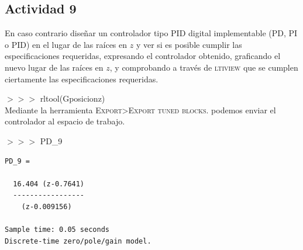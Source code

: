 \newpage
\subsection{Actividad 9}
En caso contrario diseñar un controlador tipo PID digital
implementable (PD, PI o PID) en el lugar de las raíces en $z$ y ver si
es posible cumplir las especificaciones requeridas, expresando el
controlador obtenido, graficando el nuevo lugar de las raíces en $z$,
y comprobando a través de \textsc{ltiview} que se cumplen ciertamente
las especificaciones requeridas.

\begin{tcolorbox}[sharp corners, colframe=bluebox, title= Controlador
  PD con sobreoscilamiento $< 5\%$ y $t_{est} < 0.3$.]
  $>>>$ rltool(Gposicionz)\\
  \vspace*{0.35em}
\vspace*{0.35em}
Mediante la herramienta \textsc{Export>Export tuned blocks.} podemos
enviar el controlador al espacio de trabajo.

$>>>$ PD\_9
\vspace*{0.35em}
\begin{tcolorbox}[sharp corners, colback = white]
    \color{gray}
\begin{verbatim}
PD_9 =
 
  16.404 (z-0.7641)
  -----------------
    (z-0.009156)
 
Sample time: 0.05 seconds
Discrete-time zero/pole/gain model.
\end{verbatim}
  \end{tcolorbox}%
  \vspace*{0.5em}
\end{tcolorbox}%

